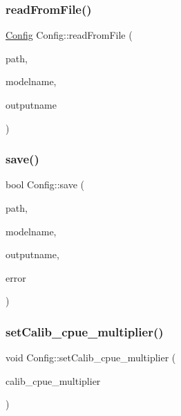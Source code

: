 \mbox{\label{class_config_a65ac3dd592c155c8153efee9ef2eb9f0}} 
\subsubsection{\texorpdfstring{readFromFile()}{readFromFile()}}
{\footnotesize\ttfamily \mbox{\hyperlink{class_config}{Config}} Config\+::read\+From\+File (\begin{DoxyParamCaption}\item[{Q\+String}]{path,  }\item[{Q\+String}]{modelname,  }\item[{Q\+String}]{outputname }\end{DoxyParamCaption})\hspace{0.3cm}{\ttfamily [static]}}

\mbox{\label{class_config_a74d4ba7919c0cc3eddb22d836861344a}} 
\subsubsection{\texorpdfstring{save()}{save()}}
{\footnotesize\ttfamily bool Config\+::save (\begin{DoxyParamCaption}\item[{Q\+String}]{path,  }\item[{Q\+String}]{modelname,  }\item[{Q\+String}]{outputname,  }\item[{Q\+String $\ast$}]{error }\end{DoxyParamCaption})}

\mbox{\label{class_config_a0a1b15fba3e853b4f9aba8b91277d3b4}} 
\subsubsection{\texorpdfstring{setCalib\_cpue\_multiplier()}{setCalib\_cpue\_multiplier()}}
{\footnotesize\ttfamily void Config\+::set\+Calib\+\_\+cpue\+\_\+multiplier (\begin{DoxyParamCaption}\item[{const Q\+List$<$ double $>$ \&}]{calib\+\_\+cpue\+\_\+multiplier }\end{DoxyParamCaption})}

